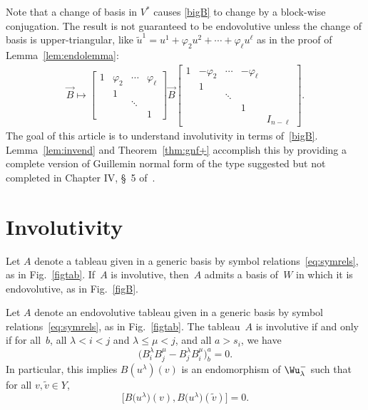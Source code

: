 Note that a change of basis in $V^*$ causes \eqref{bigB} to change by a block-wise
conjugation. The result is not guaranteed to be endovolutive unless the change of basis
is upper-triangular, like $\tilde{u}^1 = u^1 + \varphi_2 u^2 +  \cdots + \varphi_\ell u^\ell$ as in the proof of
Lemma~\ref{lem:endolemma}:
\begin{gather*}
\vec{B} \mapsto \begin{bmatrix}
1 & \varphi_2  & \cdots & \varphi_\ell \\
  & 1          &        &              \\
  &            & \ddots &              \\
  &            &        & 1
\end{bmatrix}
\vec{B}
\begin{bmatrix}
1 &-\varphi_2  & \cdots &-\varphi_\ell &     \\
  & 1          &        &              &  \\
  &            & \ddots &              &  \\
  &            &        & 1            &  \\
  &            &        &              &I_{n-\ell}
\end{bmatrix}.
\label{bigBtr}
\end{gather*}
The goal of this article is to understand involutivity in terms of~\eqref{bigB}.  Lemma~\ref{lem:invend} and Theorem~\ref{thm:gnf+}
accomplish this by providing a complete
version of Guillemin normal form of the type suggested but not completed in
Chapter IV, \S~5 of~\cite{BCGGG}.


\section{Involutivity}

\begin{Lemma}\label{lem:invend}
Let $A$ denote a tableau given in a generic basis by
symbol relations~\eqref{eq:symrels}, as in Fig.~{\rm \ref{figtab}}.
If~$A$ is involutive, then~$A$ admits a basis of~$W$ in which it is
endovolutive, as in Fig.~{\rm \ref{figB}}.
\end{Lemma}

\begin{Theorem}\label{thm:gnf+}
Let $A$ denote an endovolutive tableau given in a generic basis by
symbol relations~\eqref{eq:symrels}, as in Fig.~{\rm \ref{figtab}}.
The tableau~$A$ is involutive if and only if
for all~$b$, all $\lambda < i < j$ and $\lambda \leq \mu < j$, and all $a> s_i$, we have
\[\big(B^\lambda_iB^\mu_j - B^\lambda_jB^\mu_i\big)^a_b=0.\]
In particular, this implies $B(u^\lambda)(v)$ is an endomorphism of $\Wu^-_\lambda$ such
that
for all $v, \tilde{v} \in Y$,
\[
\big[B\big(u^\lambda\big)(v), B\big(u^\lambda\big)(\tilde{v})\big]=0.
\]
\end{Theorem}

